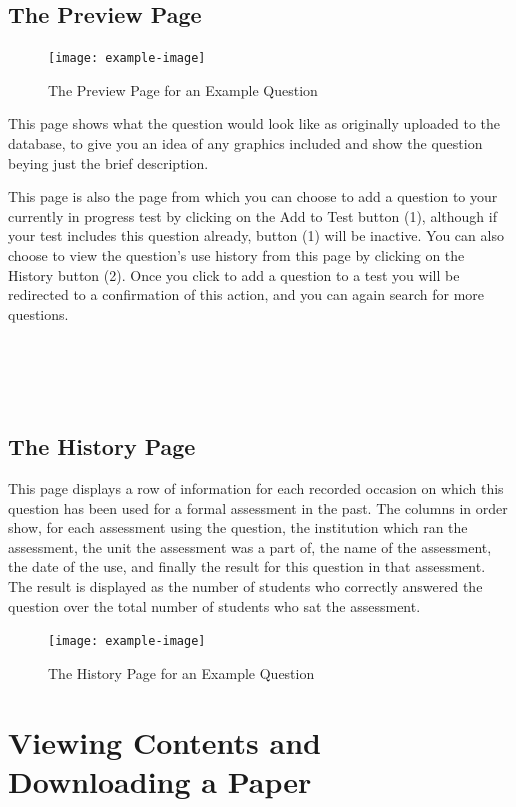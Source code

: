 \documentclass[12pt, a4paper, titlepage]{book}
\begin{document}
\section{The Preview Page}\label{sec:pre}
\begin{figure}[H]
\centering
\texttt{[image: example-image]}
\caption{The Preview Page for an Example Question}
\end{figure}
This page shows what the question would look like as originally uploaded to the database, to give you an idea of any graphics included and show the question beying just the brief description.\par
This page is also the page from which you can choose to add a question to your currently in progress test by clicking on the Add to Test button (1), although if your test includes this question already, button (1) will be inactive. You can also choose to view the question's use history from this page by clicking on the History button (2). Once you click to add a question to a test you will be redirected to a confirmation of this action, and you can again search for more questions.
\\\\\\\\\\
\section{The History Page}
This page displays a row of information for each recorded occasion on which this question has been used for a formal assessment in the past. The columns in order show, for each assessment using the question, the institution which ran the assessment, the unit the assessment was a part of, the name of the assessment, the date of the use, and finally the result for this question in that assessment. The result is displayed as the number of students who correctly answered the question over the total number of students who sat the assessment.
\begin{figure}[H]
\centering
\texttt{[image: example-image]}
\caption{The History Page for an Example Question}
\end{figure}
\chapter{Viewing Contents and Downloading a Paper}
\end{document}
